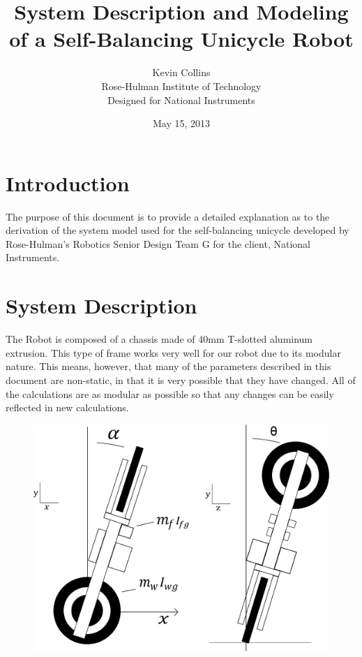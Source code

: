 \documentclass{article}
\begin{document}
\begin{titlepage}
\title{System Description and Modeling of a Self-Balancing Unicycle Robot}
\author{Kevin Collins \\ Rose-Hulman Institute of Technology \\Designed for National Instruments}
\date{May 15, 2013}
\end{titlepage}

\maketitle
\newpage

\section{Introduction}
The purpose of this document is to provide a detailed explanation as to the derivation of the system model used for the self-balancing unicycle developed by Rose-Hulman's Robotics Senior Design Team G for the client, National Instruments.

\section{System Description}
The Robot is composed of a chassis made of 40mm T-slotted aluminum extrusion.  This type of frame works very well for our robot due to its modular nature.  This means, however, that many of the parameters described in this document are non-static, in that it is very possible that they have changed.  All of the calculations are as modular as possible so that any changes can be easily reflected in new calculations.  


\begin{figure}[h]
\centering
\includegraphics[scale=0.4]{systemDescriptioinDiagram}
\end{figure}
\end{document}
